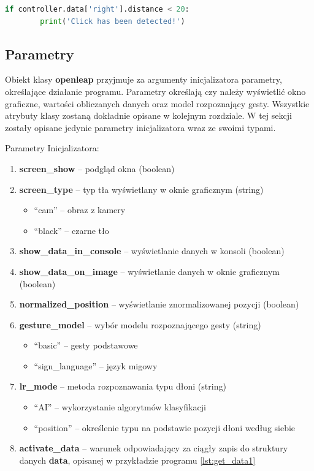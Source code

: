 \begin{lstlisting}[language=python, style=programming, caption={Odczyt edległości między palcami}]
    if controller.data['right'].distance < 20:
        print('Click has been detected!')
\end{lstlisting}

\subsection{Parametry}
\label{parametry}

\quad Obiekt klasy \textbf{openleap} przyjmuje za argumenty inicjalizatora parametry, określające działanie programu. Parametry określają czy należy wyświetlić okno graficzne, wartości obliczanych danych oraz model rozpoznający gesty. Wszystkie atrybuty klasy zostaną dokładnie opisane w kolejnym rozdziale. W tej sekcji zostały opisane jedynie parametry inicjalizatora wraz ze swoimi typami.\newline

Parametry Inicjalizatora:
\begin{enumerate}
    \item \textbf{screen\_show} -- podgląd okna (boolean)
    \item \textbf{screen\_type} -- typ tła wyświetlany w oknie graficznym (string)
    \begin{itemize}
        \item \enquote{cam} -- obraz z kamery
        \item \enquote{black} -- czarne tło
    \end{itemize}
    \item \textbf{show\_data\_in\_console} -- wyświetlanie danych w konsoli (boolean)
    \item \textbf{show\_data\_on\_image} -- wyświetlanie danych w oknie graficznym (boolean)
    \item \textbf{normalized\_position} -- wyświetlanie znormalizowanej pozycji (boolean)
    \item \textbf{gesture\_model} -- wybór modelu rozpoznającego gesty (string)
    \begin{itemize}
        \item \enquote{basic} -- gesty podstawowe
        \item \enquote{sign\_language} -- język migowy
    \end{itemize}
    \item \textbf{lr\_mode} -- metoda rozpoznawania typu dłoni (string)
    \begin{itemize}
        \item \enquote{AI} -- wykorzystanie algorytmów klasyfikacji 
        \item \enquote{position} -- określenie typu na podstawie pozycji dłoni według siebie
    \end{itemize}
    \item \textbf{activate\_data} -- warunek odpowiadający za ciągły zapis do struktury danych \textbf{data}, opisanej w przykładzie programu \ref{lst:get_data1}
\end{enumerate}


